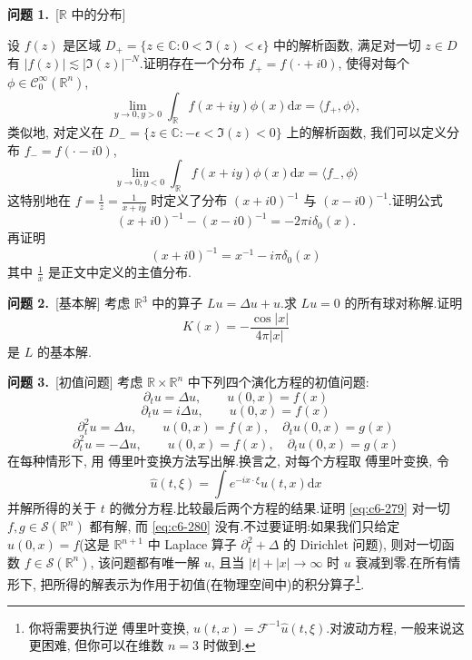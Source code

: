 \noindent\textbf{问题 1.}~[$\mathbb{R}$ 中的分布]

设 $f(z)$ 是区域 $D_+ = \{z \in \mathbb{C}: 0 < \Im(z) < \epsilon\}$ 中的解析函数, 满足对一切 $z \in D$ 有 $|f(z)| \lesssim |\Im(z)|^{-N}$.证明存在一个分布 $f_+ = f(\cdot + i0)$, 使得对每个 $\phi \in \mathcal{C}_0^\infty(\mathbb{R}^n)$,
\[
\lim_{y \to 0, y > 0} \int_{\mathbb{R}} f(x + iy) \phi(x) \mathrm{d}x = \langle f_+, \phi \rangle,
\]
类似地, 对定义在 $D_- = \{z \in \mathbb{C}: -\epsilon < \Im(z) < 0\}$ 上的解析函数, 我们可以定义分布 $f_- = f(\cdot - i0)$,
\[
\lim_{y \to 0, y < 0} \int_{\mathbb{R}} f(x + iy) \phi(x) \mathrm{d}x = \langle f_-, \phi \rangle
\]
这特别地在 $f = \frac{1}{z} = \frac{1}{x + iy}$ 时定义了分布 $(x + i0)^{-1}$ 与 $(x - i0)^{-1}$.证明公式
\[
(x + i0)^{-1} - (x - i0)^{-1} = -2\pi i \delta_0(x).
\]
再证明
\[
(x + i0)^{-1} = x^{-1} - i\pi \delta_0(x)
\]
其中 $\frac{1}{x}$ 是正文中定义的主值分布.

\noindent\textbf{问题 2.}~[基本解] 考虑 $\mathbb{R}^3$ 中的算子 $Lu = \Delta u + u$.求 $Lu = 0$ 的所有球对称解.证明
\[
K(x) = -\frac{\cos |x|}{4\pi |x|}
\]
是 $L$ 的基本解.

\noindent\textbf{问题 3.}~[初值问题] 考虑 $\mathbb{R} \times \mathbb{R}^n$ 中下列四个演化方程的初值问题:
\begin{equation}
\partial_t u = \Delta u, \qquad u(0, x) = f(x)\label{eq:c6-277}
\end{equation}
\begin{equation}
\partial_t u = i\Delta u, \qquad u(0, x) = f(x)\label{eq:c6-278}
\end{equation}
\begin{equation}
\partial_t^2 u = \Delta u, \qquad u(0, x) = f(x), \quad \partial_t u(0, x) = g(x)\label{eq:c6-279}
\end{equation}
\begin{equation}
\partial_t^2 u = -\Delta u, \qquad u(0, x) = f(x), \quad \partial_t u(0, x) = g(x)\label{eq:c6-280}
\end{equation}
在每种情形下, 用 傅里叶变换方法写出解.换言之, 对每个方程取 傅里叶变换, 令
\[
\hat{u}(t, \xi) = \int e^{-ix \cdot \xi} u(t, x) \mathrm{d}x
\]
并解所得的关于 $t$ 的微分方程.比较最后两个方程的结果.证明 \eqref{eq:c6-279} 对一切 $f, g \in \mathcal{S}(\mathbb{R}^n)$ 都有解, 而 \eqref{eq:c6-280} 没有.不过要证明:如果我们只给定 $u(0, x) = f$(这是 $\mathbb{R}^{n+1}$ 中 Laplace 算子 $\partial_t^2 + \Delta$ 的 Dirichlet 问题), 则对一切函数 $f \in \mathcal{S}(\mathbb{R}^n)$, 该问题都有唯一解 $u$, 且当 $|t| + |x| \to \infty$ 时 $u$ 衰减到零.在所有情形下, 把所得的解表示为作用于初值(在物理空间中)的积分算子\footnote{你将需要执行逆 傅里叶变换, $u(t, x) = \mathcal{F}^{-1} \hat{u}(t, \xi)$.对波动方程, 一般来说这更困难, 但你可以在维数 $n = 3$ 时做到.}.

